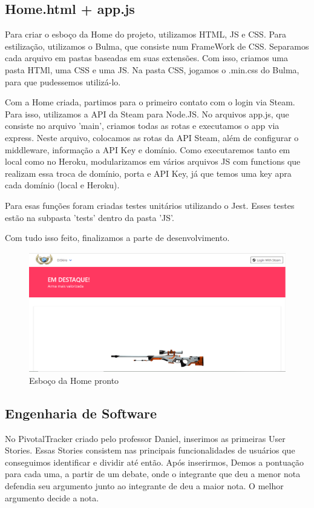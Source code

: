    \subsection{Home.html + app.js}
    Para criar o esboço da Home do projeto, utilizamos HTML, JS e CSS. Para estilização, utilizamos o Bulma,
    que consiste num FrameWork de CSS. Separamos cada arquivo em pastas baseadas em suas extensões. 
    Com isso, criamos uma pasta HTMl, uma CSS e uma JS. Na pasta CSS, jogamos o .min.css do Bulma, para que 
    pudessemos utilizá-lo.

    Com a Home criada, partimos para o primeiro contato com o login via Steam. Para isso, utilizamos a API
    da Steam para Node.JS. No arquivos app.js, que consiste no arquivo 'main', criamos todas as rotas
    e executamos o app via express. Neste arquivo, colocamos as rotas da API Steam, além de configurar
    o middleware, informação a API Key e domínio. Como executaremos tanto em local como no Heroku, modularizamos
    em vários arquivos JS com functions que realizam essa troca de domínio, porta e API Key, já que temos
    uma key apra cada domínio (local e Heroku). 

    Para esas funções foram criadas testes unitários utilizando o Jest. Esses testes estão na subpasta 'tests' 
    dentro da pasta 'JS'.

    Com tudo isso feito, finalizamos a parte de desenvolvimento.\\
    \begin{figure}[!htb]
        \centering
        \includegraphics[scale=0.5]{Imagens/Home.png}
        \caption{Esboço da Home pronto}
    \end{figure}

    \subsection{Engenharia de Software}
    No PivotalTracker criado pelo professor Daniel, inserimos as primeiras User Stories. Essas Stories consistem 
    nas principais funcionalidades de usuários que conseguimos identificar e dividir até então. Após inserirmos, 
    Demos a pontuação para cada uma, a partir de um debate, onde o integrante que deu a menor nota defendia seu argumento 
    junto ao integrante de deu a maior nota. O melhor argumento decide a nota.

